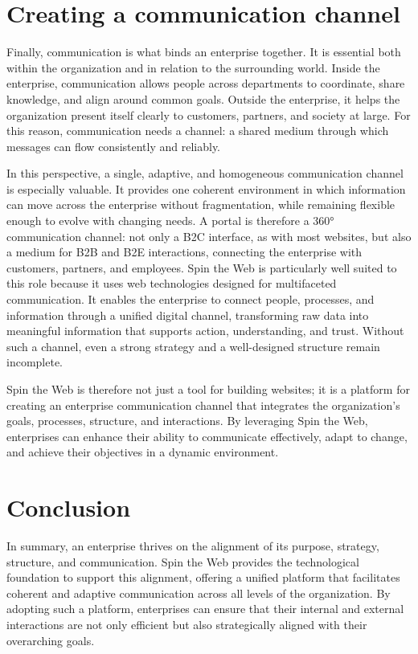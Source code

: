 \section{Creating a communication channel}
Finally, communication is what binds an enterprise together. It is essential both within the organization and in relation to the surrounding world. Inside the enterprise, communication allows people across departments to coordinate, share knowledge, and align around common goals. Outside the enterprise, it helps the organization present itself clearly to customers, partners, and society at large. For this reason, communication needs a channel: a shared medium through which messages can flow consistently and reliably.

In this perspective, a single, adaptive, and homogeneous communication channel is especially valuable. It provides one coherent environment in which information can move across the enterprise without fragmentation, while remaining flexible enough to evolve with changing needs. A portal is therefore a 360° communication channel: not only a B2C interface, as with most websites, but also a medium for B2B and B2E interactions, connecting the enterprise with customers, partners, and employees. Spin the Web is particularly well suited to this role because it uses web technologies designed for multifaceted communication. It enables the enterprise to connect people, processes, and information through a unified digital channel, transforming raw data into meaningful information that supports action, understanding, and trust. Without such a channel, even a strong strategy and a well-designed structure remain incomplete.

Spin the Web is therefore not just a tool for building websites; it is a platform for creating an enterprise communication channel that integrates the organization's goals, processes, structure, and interactions. By leveraging Spin the Web, enterprises can enhance their ability to communicate effectively, adapt to change, and achieve their objectives in a dynamic environment.

\section{Conclusion}
In summary, an enterprise thrives on the alignment of its purpose, strategy, structure, and communication. Spin the Web provides the technological foundation to support this alignment, offering a unified platform that facilitates coherent and adaptive communication across all levels of the organization. By adopting such a platform, enterprises can ensure that their internal and external interactions are not only efficient but also strategically aligned with their overarching goals.

